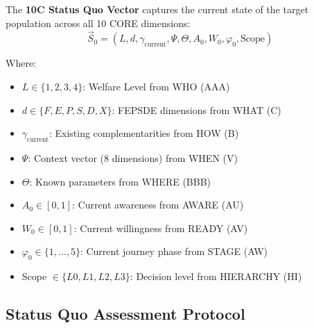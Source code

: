 \begin{tcolorbox}[colback=purple!5!white, colframe=purple!75!black,
    title=\textbf{Definition HHH-D0: 10C Status Quo Vector}]

The \textbf{10C Status Quo Vector} captures the current state of the target population across all 10 CORE dimensions:
\begin{equation}
\boxed{\vec{S}_0 = (L, d, \gamma_{\text{current}}, \Psi, \Theta, A_0, W_0, \varphi_0, \text{Scope})}
\label{eq:hhh-status-quo-vector}
\end{equation}

Where:
\begin{itemize}[nosep]
\item $L \in \{1, 2, 3, 4\}$: Welfare Level from WHO (AAA)
\item $d \in \{F, E, P, S, D, X\}$: FEPSDE dimensions from WHAT (C)
\item $\gamma_{\text{current}}$: Existing complementarities from HOW (B)
\item $\Psi$: Context vector (8 dimensions) from WHEN (V)
\item $\Theta$: Known parameters from WHERE (BBB)
\item $A_0 \in [0, 1]$: Current awareness from AWARE (AU)
\item $W_0 \in [0, 1]$: Current willingness from READY (AV)
\item $\varphi_0 \in \{1, ..., 5\}$: Current journey phase from STAGE (AW)
\item Scope $\in \{L0, L1, L2, L3\}$: Decision level from HIERARCHY (HI)
\end{itemize}
\end{tcolorbox}

\subsection{Status Quo Assessment Protocol}

